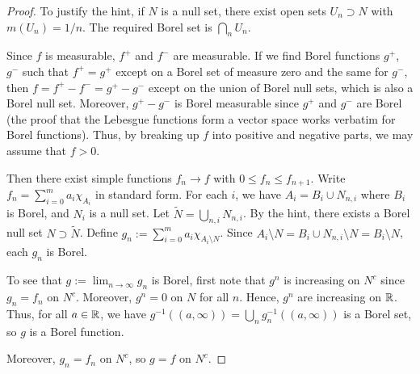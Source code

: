 \documentclass{article}
\begin{document}
\begin{proof}
To justify the hint, if $N$ is a null set, there exist open sets $U_n \supset N$ with $m(U_n) = 1/n$. The required Borel set is $\bigcap_n U_n$.

Since $f$ is measurable, $f^+$ and $f^-$ are measurable.  If we find Borel functions $g^+$, $g^-$  such that $f^+ = g^+$  except on a Borel set of measure zero and the same for $g^-$, then $f = f^+ - f^- = g^+ - g^-$ except on the union of Borel null sets, which is also a Borel null set. Moreover, $g^+ -  g^-$ is Borel measurable since $g^+$ and $g^-$ are Borel (the proof that the Lebesgue functions form a vector space works verbatim for Borel functions). Thus, by breaking up $f$ into positive and negative parts, we may assume that $f > 0$.

Then there exist simple functions $f_n \to f$ with $0 \le f_n \le f_{n+1}$.  Write $f_n = \sum_{i=0}^m a_i \chi_{A_i}$ in standard form. For each $i$, we have $A_i = B_i \cup N_{n,i}$ where $B_i$ is Borel, and $N_i$ is a null set.  Let $\widetilde{N} = \bigcup_{n,i} N_{n,i}$. By the hint, there exists a Borel null set $N \supset \widetilde{N}$.  Define $g_n :=  \sum_{i=0}^m a_i \chi_{A_i \setminus N}$. Since $A_i \setminus N = B_i \cup N_{n,i} \setminus N = B_i \setminus N$, each $g_n$ is Borel.  

To see that $g := \lim_{n\to \infty} g_n$ is Borel, first note that $g^n$ is increasing on $N^c$ since $g_n = f_n$ on $N^c$.  Moreover, $g^n = 0$ on $N$ for all $n$.  Hence, $g^n$ are increasing on $\mathbb{R}$. Thus, for all $a\in\mathbb{R}$, we have $g^{-1}((a, \infty)) = \bigcup_n g_n^{-1}((a,\infty))$ is a Borel set, so $g$ is a Borel function.

Moreover, $g_n = f_n$ on $N^c$, so $g = f$ on $N^c$. 
\begin{comment}
Let $(A_n)$ be a countable base for $\R$ such that $\sup_n \diam(A_n) < 1/2$. Since $f$ is measurable, for each $n$, there exist a Borel set $B_n$ and a null set $\widetilde{N_n}$ disjoint from $B_n$ such that $f^{-1}(A_n) = B_n \cup \widetilde{N_n}$. By the hint, then, $f^{-1}(A_n) \subset B_n \cup N_n$ for some null Borel set $N_n$. Let $N := \bigcup_n N_n$.

Let $g := \chi_{N^c} f$. Let $d:\R \to \R^2$ is the diagonal map, and $\mu:\R^2 \to R$ be the multiplication map. Then $g = \mu \circ (f, \chi_{N^c}) \circ d$. Note that $(A_n \times A_m)_{n,m}$ is a countable base for $\R^2$. 

Let $U \subset \R$ be open.  Since $\mu$ is continuous, $\mu^{-1} (U)$ is open so can be written as $\mu^{-1} (U) = \bigcup_{(n,m) \in C} A_n \times A_m$ for some countable set $C$.  Note that for each $n,m$, we have $(f, \chi_{N^c})^{-1}(A_n \times A_m) = f^{-1}(A_n) \times \chi_{N^c}^{-1} (A_m) = (B_n \cup N_n) \times (\emptyset \text{ or } N^c \text{ or } N)$, where the last equality follows from the fact that $\diam(A_m) < 1/2$ (so $\chi_{N^c}^{-1} (A_m) \ne \R$).  Applying $d^{-1}$ is just taking the intersection, so $d^{-1}((f, \chi_{N^c})^{-1}(A_n \times A_m)) = (B_n \cup N_n) \cap (\emptyset \text{ or } N^c \text{ or } N)$
\end{comment}


\end{proof}
\end{document}
